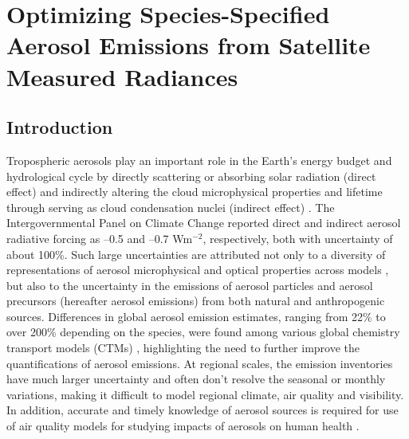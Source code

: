 \chapter{Optimizing Species-Specified Aerosol Emissions from Satellite
Measured Radiances} \label{chap:optems}

\section{Introduction}

Tropospheric aerosols play an important role in the Earth’s energy budget and
hydrological cycle by directly scattering or absorbing solar radiation
(direct effect) and indirectly altering the cloud microphysical
properties and lifetime through serving as cloud condensation nuclei
(indirect effect) \citep{Haywood00}. The Intergovernmental Panel on
Climate Change \citep{IPCC07} reported direct and indirect aerosol
radiative forcing as --0.5 and --0.7 Wm$^{-2}$, respectively, both with 
uncertainty of about 100\%. Such large uncertainties are attributed not only 
to a diversity of representations of aerosol microphysical and optical 
properties across models \citep{Schulz06}, but also to the uncertainty in the 
emissions of aerosol particles and aerosol precursors (hereafter aerosol 
emissions) from both natural and anthropogenic sources.  Differences in global
aerosol emission estimates, ranging from 22\% to over 200\% depending on the 
species, were found among various global chemistry transport models (CTMs) 
\citep{Textor06}, highlighting the need to further improve the quantifications
of aerosol emissions. At regional scales, the emission inventories have much
larger uncertainty \citep{Streets03} and often don’t resolve the seasonal or
monthly variations, making it difficult to model regional climate, air quality
and visibility. In addition, accurate and timely knowledge of aerosol sources
is required for use of air quality models for studying impacts of aerosols on
human health \citep{Pope09}.

